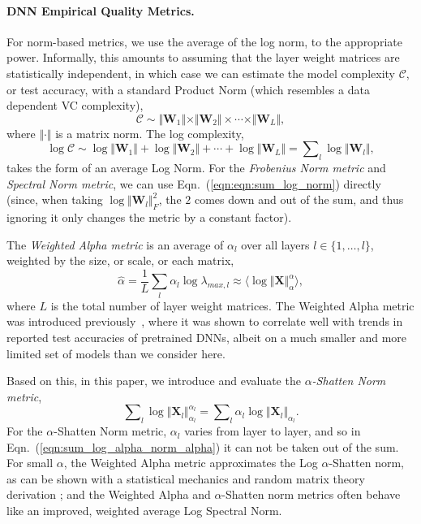 \paragraph{DNN Empirical Quality Metrics.}

For norm-based metrics, we use the average of the log norm, to the appropriate power.
Informally, this amounts to assuming that the layer weight matrices are statistically independent, in which case we can estimate the model complexity $\mathcal{C}$, or test accuracy, with a standard Product Norm (which resembles a data dependent VC complexity),
\begin{equation}
\mathcal{C}\sim\Vert\mathbf{W}_{1}\Vert\times\Vert\mathbf{W}_{2}\Vert \times \cdots \times \Vert\mathbf{W}_{L}\Vert ,
\end{equation}
where $\Vert\cdot\Vert$ is a matrix norm.   
The log complexity,
\begin{equation}
\label{eqn:eqn:sum_log_norm}
\log\mathcal{C} \sim \log\Vert\mathbf{W}_{1}\Vert+\log\Vert\mathbf{W}_{2}\Vert + \cdots + \log\Vert\mathbf{W}_{L}\Vert = \sum\nolimits_l \log\Vert\mathbf{W}_{l}\Vert ,
\end{equation}
 takes the form of an average Log Norm.
For the \emph{Frobenius Norm metric} and \emph{Spectral Norm metric}, we can use Eqn.~(\ref{eqn:eqn:sum_log_norm}) directly (since, when taking $\log\Vert\mathbf{W}_{l}\Vert_{F}^{2}$, the $2$ comes down and out of the sum, and thus ignoring it only changes the metric by a constant factor).


The \emph{Weighted Alpha metric} is an average of $\alpha_l$ over all layers $l \in \{1,\ldots,l\}$, weighted by the size, or scale, or each matrix,
\begin{equation}
\hat{\alpha} = \dfrac{1}{L}\sum_l \alpha_l\log\lambda_{max,l}\approx\langle\log\Vert\mathbf{X}\Vert_{\alpha}^{\alpha}\rangle    ,
\end{equation}
where $L$ is the total number of layer weight matrices.
The Weighted Alpha metric was introduced previously~\cite{MM20_SDM}, where it was shown to correlate well with trends in reported test accuracies of pretrained DNNs, albeit on a much smaller and more limited set of models than we consider here.

Based on this, in this paper, we introduce and evaluate the \emph{$\alpha$-Shatten Norm metric},
\begin{equation}
\label{eqn:sum_log_alpha_norm_alpha}
\sum\nolimits_l \log \Vert\mathbf{X}_l\Vert_{\alpha_l}^{\alpha_l} 
=
\sum\nolimits_l \alpha_l \log \Vert\mathbf{X}_l\Vert_{\alpha_l} .
\end{equation}
For the $\alpha$-Shatten Norm metric, $\alpha_l$ varies from layer to layer, and so in Eqn.~(\ref{eqn:sum_log_alpha_norm_alpha}) it can not be taken out of the sum.
For small $\alpha$, the Weighted Alpha metric approximates the Log $\alpha$-Shatten norm, as can be shown with a statistical mechanics and random matrix theory derivation \cite{MM20_unpub_work}; and the Weighted Alpha and $\alpha$-Shatten norm metrics often behave like an improved, weighted average Log Spectral Norm.


